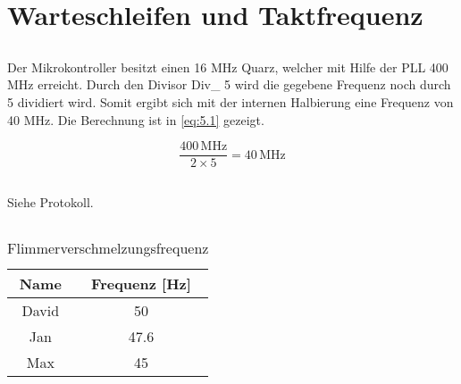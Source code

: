 \section{Warteschleifen und Taktfrequenz}
\subsection{}
Der Mikrokontroller besitzt einen 16 MHz Quarz, welcher mit Hilfe der PLL 400 MHz erreicht. Durch den Divisor Div\_ 5 wird die gegebene Frequenz noch durch 5 dividiert wird. Somit ergibt sich mit der internen Halbierung eine Frequenz von 40 MHz. Die Berechnung ist in \autoref{eq:5.1} gezeigt.
 
\begin{equation}
\label{eq:5.1}
\frac{400\,\text{MHz}}{2\times 5}=40\,\text{MHz}
\end{equation}

\subsection{}
Siehe Protokoll.

\subsection{}
\begin{table}[htb]
    \centering
    \caption{Flimmerverschmelzungsfrequenz}
    \label{tab:Flimmerverschmelzungsfrequenz}
    \begin{tabular}{cc}
        \toprule
        Name & Frequenz [\si{\hertz}] \\
        \midrule
        David & \num{50}  \\
        Jan & \num{47.6} \\
        Max & \num{45} \\
        \bottomrule
    \end{tabular}
    
\end{table}